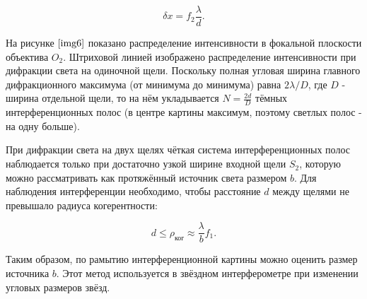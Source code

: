 \documentclass[a4paper,12pt]{article} %
\begin{document}
\[ \delta x=f_2\frac{\lambda}{d}. \]

На рисунке $\ref{img6}$ показано распределение интенсивности в фокальной плоскости объектива $O_2$. Штриховой линией изображено распределение интенсивности при дифракции света на одиночной щели. Поскольку полная угловая ширина главного дифракционного максимума (от минимума до минимума) равна $2\lambda/D$, где $D$ - ширина отдельной щели, то на нём укладывается $N=\frac{2d}{D} \text{ тёмных}$ интерференционных полос (в центре картины максимум, поэтому светлых полос - на одну больше).

При дифракции света на двух щелях чёткая система интерференционных полос наблюдается только при достаточно узкой ширине входной щели $S_2$, которую можно рассматривать как протяжённый источник света размером $b$. Для наблюдения интерференции необходимо, чтобы расстояние $d$ между щелями не превышало $\text{радиуса когерентности}$:

\[ d \leq\rho_{\text{ког}} \approx \frac{\lambda}{b}f_1. \]

Таким образом, по рамытию интерференционной картины можно оценить размер источника $b$. Этот метод используется в звёздном интерферометре при изменении угловых размеров звёзд.
\end{document}
